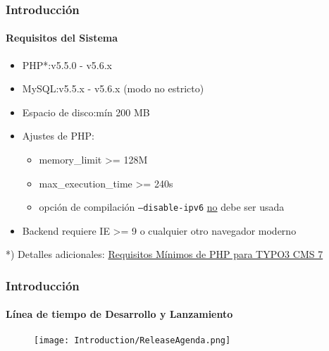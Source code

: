 \begin{frame}[fragile]
	\frametitle{Introducción}
	\framesubtitle{Requisitos del Sistema}

	\begin{itemize}
		\item PHP*:\tabto{2.2cm}v5.5.0 - v5.6.x
		\item MySQL:\tabto{2.2cm}v5.5.x - v5.6.x (modo no estricto)
		\item Espacio de disco:\tabto{3.4cm}mín 200 MB
		\item Ajustes de PHP:

			\begin{itemize}
				\item memory\_limit >= 128M
				\item max\_execution\_time >= 240s
				\item opción de compilación \texttt{--disable-ipv6} \underline{no} debe ser usada
			\end{itemize}

		\item Backend requiere IE >= 9 o cualquier otro navegador moderno

	\end{itemize}

	\vspace{1cm}
	*) Detalles adicionales: \href{http://typo3.org/news/article/php-minimum-requirements-for-typo3-cms-7/}{Requisitos Mínimos de PHP para TYPO3 CMS 7}

\end{frame}

\begin{frame}[fragile]
	\frametitle{Introducción}
	\framesubtitle{Línea de tiempo de Desarrollo y Lanzamiento}

	\begin{figure}
		\texttt{[image: Introduction/ReleaseAgenda.png]}
	\end{figure}

\end{frame}

